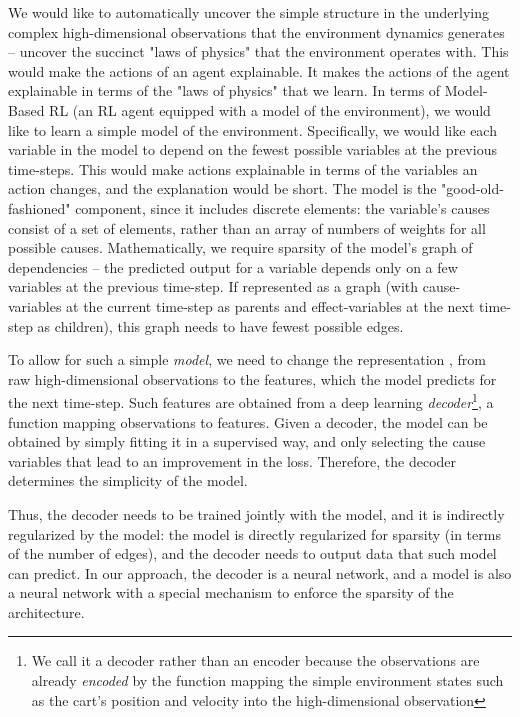 \documentclass[a4paper,11pt,oneside]{report}
\begin{document}
We would like to automatically uncover the simple structure in the underlying complex high-dimensional observations that the environment dynamics generates -- uncover the succinct "laws of physics" \cite{Bakhtin2019} that the environment operates with.
This would make the actions of an agent explainable.
It makes the actions of the agent explainable in terms of the "laws of physics" that we learn. In terms of Model-Based RL \cite{DeBruin2018,Corneil2018,Kaiser2019} (an RL agent equipped with a model of the environment), we would like to learn a simple model of the environment.
Specifically, we would like each variable in the model to depend on the fewest possible variables at the previous time-steps. This would make actions explainable in terms of the variables an action changes, and the explanation would be short. The model is the "good-old-fashioned" component, since it includes discrete elements: the variable's causes consist of a set of elements, rather than an array of numbers of weights for all possible causes.
Mathematically, we require sparsity of the model's graph of dependencies -- the predicted output for a variable depends only on a few variables at the previous time-step. If represented as a graph (with cause-variables at the current time-step as parents and effect-variables at the next time-step as children), this graph needs to have fewest possible edges.

To allow for such a simple {\em model}, we need to change the representation \cite{Kamalaruban}, from raw high-dimensional observations to the features, which the model predicts for the next time-step. Such features are obtained from a deep learning {\em decoder}\footnote{We call it a decoder rather than an encoder because the observations are already {\em encoded} by the function mapping the simple environment states such as the cart's position and velocity into the high-dimensional observation}, a function mapping observations to features. Given a decoder, the model can be obtained by simply fitting it in a supervised way, and only selecting the cause variables that lead to an improvement in the loss. Therefore, the decoder determines the simplicity of the model.

Thus, the decoder needs to be trained jointly with the model, and it is indirectly regularized by the model: the model is directly regularized for sparsity (in terms of the number of edges), and the decoder needs to output data that such model can predict.
In our approach, the decoder is a neural network, and a model is also a neural network with a special mechanism to enforce the sparsity of the architecture.
\end{document}
